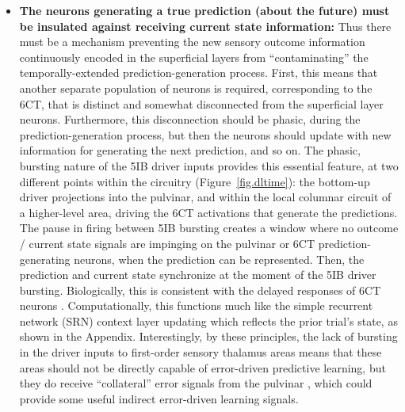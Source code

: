 \documentclass[11pt,twoside]{article}
\newif\myifpdf
\begin{document}
\begin{itemize}
	\item {\bf The neurons generating a true prediction (about the future) must be insulated against receiving current state information:} Thus there must be a mechanism preventing the new sensory outcome information continuously encoded in the superficial layers from ``contaminating'' the temporally-extended prediction-generation process.  First, this means that another separate population of neurons is required, corresponding to the 6CT, that is distinct and somewhat disconnected from the superficial layer neurons.  Furthermore, this disconnection should be phasic, during the prediction-generation process, but then the neurons should update with new information for generating the next prediction, and so on.  The phasic, bursting nature of the 5IB driver inputs provides this essential feature, at two different points within the circuitry (Figure~\ref{fig.dltime}): the bottom-up driver projections into the pulvinar, and within the local columnar circuit of a higher-level area, driving the 6CT activations that generate the predictions.  The pause in firing between 5IB bursting creates a window where no outcome / current state signals are impinging on the pulvinar or 6CT prediction-generating neurons, when the prediction can be represented.  Then, the prediction and current state synchronize at the moment of the 5IB driver bursting.  Biologically, this is consistent with the delayed responses of 6CT neurons \citep{HarrisShepherd15,SakataHarris09,Thomson10}.  Computationally, this functions much like the simple recurrent network (SRN) context layer updating \citep{Elman90,Jordan89} which reflects the prior trial's state, as shown in the Appendix.  Interestingly, by these principles, the lack of bursting in the driver inputs to first-order sensory thalamus areas \citep{ShermanGuillery06} means that these areas should not be directly capable of error-driven predictive learning, but they do receive ``collateral'' error signals from the pulvinar \citep{Shipp03}, which could provide some useful indirect error-driven learning signals.


\end{itemize}
\end{document}
